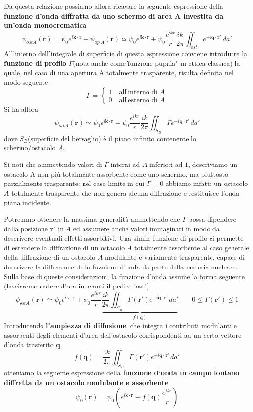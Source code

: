 Da questa relazione possiamo allora ricavare la seguente espressione della \textbf{funzione d'onda diffratta da uno schermo di area A investita da un'onda monocromatica}
\[
	\psi_{ost A}(\bm{r}) =  \psi_0e^{i \bm{k} \cdot \bm{r}}- \psi_{ap \  A}(\bm{r}) \simeq \psi_0e^{i \bm{k} \cdot \bm{r}} + \psi_0 \frac{e^{ikr}}{r} \frac{ik}{2 \pi} \iint_{ost}e^{-i \bm{q} \cdot \bm{r'}} \, da'
\]
All'interno dell'integrale di superficie di questa espressione conviene introdurre la \textbf{funzione di profilo} $\Gamma$(nota anche come \`f̀unzione pupilla" in ottica classica) la quale, nel caso di una apertura A totalmente trasparente, risulta definita nel modo seguente
\[
	\Gamma =
	\begin{cases}
		1   \quad \text{all'interno di } A \\
		0  \quad \text{all'esterno di } A
	\end{cases}
\] Si ha allora \[
	\psi_{ost A}(\bm{r}) \simeq \psi_0e^{i \bm{k} \cdot \bm{r}} + \psi_0 \frac{e^{ikr}}{r} \frac{ik}{2 \pi} \iint_{S_B} \Gamma e^{-i \bm{q} \cdot \bm{r'}} \, da'
\] dove $S_B$(superficie del bersaglio) è il piano infinito contenente lo schermo/ostacolo $A$.

Si noti che ammettendo valori di $\Gamma$ interni ad $A$ inferiori ad $1$, descriviamo un ostacolo A non più totalmente assorbente come uno schermo, ma piuttosto parzialmente trasparente: nel caso limite in cui $\Gamma = 0$ abbiamo infatti un ostacolo $A$ totalmente trasparente che non genera alcuna diffrazione e restituisce l'onda piana incidente.

Potremmo ottenere la massima generalità ammettendo che $\Gamma$ possa dipendere dalla posizione $\bm{r}'$ in $A$ ed assumere anche valori immaginari in modo da descrivere eventuali effetti assorbitivi.
Una simile funzione di profilo ci permette di estendere la diffrazione di un ostacolo $A$ totalmente assorbente al caso generale della diffrazione di un ostacolo $A$ modulante e variamente trasparente, capace di descrivere la diffrazione della fuznione d'onda da parte della materia nucleare.
Sulla base di queste considerazioni, la funzione d'onda assume la forma seguente (lascieremo cadere d'ora in avanti il pedice 'ost')
\[
	\psi_{ost A}(\bm{r}) \simeq \psi_0e^{i \bm{k} \cdot \bm{r}} + \psi_0 \frac{e^{ikr}}{r} \underbrace{\frac{ik}{2 \pi} \iint_{S_B} \Gamma(\bm{r}') e^{-i \bm{q} \cdot \bm{r'}} \, da'}_{f(\bm{q})}
	\qquad 0 \leq \Gamma(\bm{r}') \leq 1
\]
Introducendo \textbf{l'ampiezza di diffusione}, che integra i contributi modulanti e assorbenti degli elementi d'area dell'ostacolo corrispondenti ad un certo vettore d'onda trasferito $\bm{q}$
\[
	f(\bm{q}) = \frac{ik}{2 \pi} \iint_{S_B} \Gamma(\bm{r}')e^{-i \bm{q} \cdot \bm{r}'} \, da'
\]
otteniamo la seguente espressione della \textbf{funzione d'onda in campo lontano diffratta da un ostacolo modulante e assorbente}
\begin{equation}
	\psi_0(\bm{r}) = \psi_0 \left(e^{i \bm{k} \cdot \bm{r}} +
	f(\bm{q}) \frac{e^{ikr}}{r}\right)
\end{equation}

